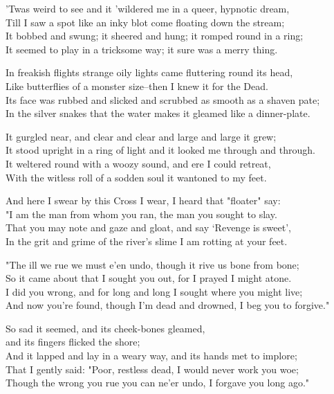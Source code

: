 \begin{poemblock}
'Twas weird to see and it 'wildered me in a queer, hypnotic dream,\\
Till I saw a spot like an inky blot come floating down the stream;\\
It bobbed and swung; it sheered and hung; it romped round in a ring;\\
It seemed to play in a tricksome way; it sure was a merry thing.

In freakish flights strange oily lights came fluttering round its head,\\
Like butterflies of a monster size--then I knew it for the Dead.\\
Its face was rubbed and slicked and scrubbed as smooth as a shaven pate;\\
In the silver snakes that the water makes it gleamed like a dinner-plate.

It gurgled near, and clear and clear and large and large it grew;\\
It stood upright in a ring of light and it looked me through and through.\\
It weltered round with a woozy sound, and ere I could retreat,\\
With the witless roll of a sodden soul it wantoned to my feet.

And here I swear by this Cross I wear, I heard that "floater" say:\\
"I am the man from whom you ran, the man you sought to slay.\\
That you may note and gaze and gloat, and say `Revenge is sweet',\\
In the grit and grime of the river's slime I am rotting at your feet.

"The ill we rue we must e'en undo, though it rive us bone from bone;\\
So it came about that I sought you out, for I prayed I might atone.\\
I did you wrong, and for long and long I sought where you might live;\\
And now you're found, though I'm dead and drowned, I beg you to forgive."

So sad it seemed, and its cheek-bones gleamed,\\
\idt and its fingers flicked the shore;\\
And it lapped and lay in a weary way, and its hands met to implore;\\
That I gently said:  "Poor, restless dead, I would never work you woe;\\
Though the wrong you rue you can ne'er undo, I forgave you long ago."


\end{poemblock}
